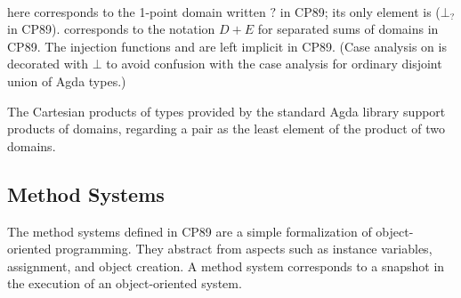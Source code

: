 \begin{AgdaAlign}
\begin{code}
\AgdaSpace{}%
\AgdaSpace{}%
\AgdaSpace{}%
\AgdaSpace{}%
\AgdaSpace{}%
\AgdaSpace{}%
\AgdaSpace{}%
\AgdaSymbol{)}\AgdaSpace{}%
\<%
\\
%
\>[19]\AgdaSpace{}%
\AgdaSpace{}%
\AgdaSpace{}%
\AgdaSpace{}%
\AgdaSpace{}%
\AgdaSpace{}%
\AgdaSpace{}%
\AgdaSpace{}%
\AgdaSpace{}%
\AgdaSymbol{)}\<%
\end{code}
%
 here corresponds to the 1-point domain written $?$ in CP89;
its only element is  ($⊥_?$ in CP89).
 corresponds to the notation $D + E$ for separated sums of domains in CP89.
The injection functions  and  are left implicit in CP89.
(Case analysis  on  is decorated with $⊥$ to avoid confusion with
the case analysis for ordinary disjoint union of Agda types.)

The Cartesian products of types provided by the standard Agda library support products of domains,
regarding a pair  as the least element of the product of two domains.  

\subsection{Method Systems}

The method systems defined in CP89 are a simple formalization of object-oriented programming.
They abstract from aspects such as instance variables, assignment, and object creation.
A method system corresponds to a snapshot in the execution of an object-oriented system.


\end{AgdaAlign}
